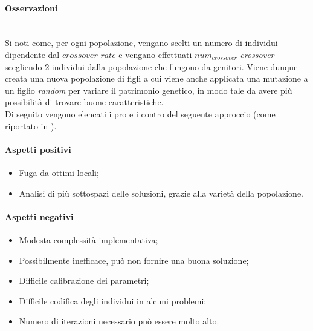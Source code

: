 \noindent \paragraph{Osservazioni}\hfill\\
Si noti come, per ogni popolazione, vengano scelti un numero di individui dipendente dal {$crossover\_rate$}
e vengano effettuati {$num_{crossover}$} \textit{crossover} scegliendo 2 individui dalla popolazione che fungono da genitori.
Viene dunque creata una nuova popolazione di figli a cui viene anche applicata una mutazione a un figlio \textit{random} per
variare il patrimonio genetico, in modo tale da avere più possibilità di trovare buone caratteristiche.\\
Di seguito vengono elencati i pro e i contro del seguente approccio (come riportato in \cite{site:articolo-alg-gen} \cite{site:paper-lo-go}).\\

\noindent \paragraph{Aspetti positivi}
\begin{itemize}
    \item Fuga da ottimi locali;
    \item Analisi di più sottospazi delle soluzioni, grazie alla varietà della popolazione.
\end{itemize}

\noindent \paragraph{Aspetti negativi}
\begin{itemize}
    \item Modesta complessità implementativa;
    \item Possibilmente inefficace, può non fornire una buona soluzione;
    \item Difficile calibrazione dei parametri;
    \item Difficile codifica degli individui in alcuni problemi;
    \item Numero di iterazioni necessario può essere molto alto.
\end{itemize}
\newpage
